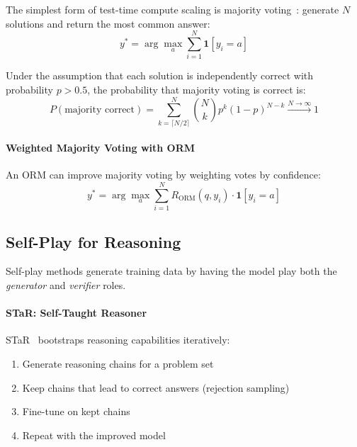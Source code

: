 The simplest form of test-time compute scaling is majority voting~\cite{wang2023selfconsistency}: generate $N$ solutions and return the most common answer: 
\begin{equation}
    y^* = \arg\max_{a} \sum_{i=1}^{N} \mathbf{1}[y_i = a]
\end{equation}

Under the assumption that each solution is independently correct with probability $p > 0.5$, the probability that majority voting is correct is: 
\begin{equation}
    P(\text{majority correct}) = \sum_{k=\lceil N/2 \rceil}^{N} \binom{N}{k} p^k (1-p)^{N-k} \xrightarrow{N \to \infty} 1
\end{equation}

\paragraph{Weighted Majority Voting with ORM}
\label{weighted-majority-voting-with-orm}

An ORM can improve majority voting by weighting votes by confidence: 
\begin{equation}
    y^* = \arg\max_{a} \sum_{i=1}^{N} R_{\text{ORM}}(q, y_i) \cdot \mathbf{1}[y_i = a]
\end{equation}

\subsection{Self-Play for Reasoning}
\label{self-play-for-reasoning}

Self-play methods generate training data by having the model play both the \emph{generator} and \emph{verifier} roles.

\paragraph{STaR: Self-Taught Reasoner}
\label{star-self-taught-reasoner}

STaR~\cite{zelikman2022star} bootstraps reasoning capabilities iteratively:

\begin{enumerate}
  \item Generate reasoning chains for a problem set
  \item Keep chains that lead to correct answers (rejection sampling)
  \item Fine-tune on kept chains
  \item Repeat with the improved model
\end{enumerate}


